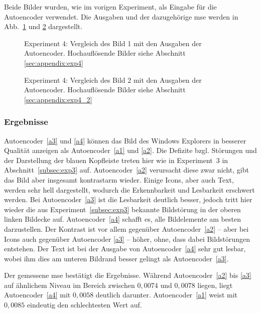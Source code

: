 Beide Bilder wurden, wie im vorigen Experiment, als Eingabe für die Autoencoder verwendet. Die Ausgaben und der dazugehörige \gls{mse} werden in Abb.~\ref{exp4_image:1} und \ref{exp4_image:2} dargestellt.

\begin{figure}[htbp]
    \centering
    \resizebox*{!}{.98\textheight}{}
    \caption{Experiment 4: Vergleich des Bild 1 mit den Ausgaben der Autoencoder. Hochauflösende Bilder siehe Abschnitt \ref{sec:appendix:exp4}}
    \label{exp4_image:1}
\end{figure}

\begin{figure}[htbp]
    \centering
    \resizebox*{!}{.98\textheight}{}
    \caption{Experiment 4: Vergleich des Bild 2 mit den Ausgaben der Autoencoder. Hochauflösende Bilder siehe Abschnitt \ref{sec:appendix:exp4_2}}
    \label{exp4_image:2}
\end{figure}

\subsubsection*{Ergebnisse}
Autoencoder~\ref{a3} und \ref{a4} können das Bild des Windows Explorers in besserer Qualität anzeigen als Autoencoder~\ref{a1} und \ref{a2}. Die Defizite bzgl. Störungen und der Darstellung der blauen Kopfleiste treten hier wie in Experiment~3 in Abschnitt~\ref{subsec:exp3} auf. Autoencoder~\ref{a2} verursacht diese zwar nicht, gibt das Bild aber insgesamt kontrastarm wieder. Einige Icons, aber auch Text, werden sehr hell dargestellt, wodurch die Erkennbarkeit und Lesbarkeit erschwert werden. Bei Autoencoder~\ref{a3} ist die Lesbarkeit deutlich besser, jedoch tritt hier wieder die aus Experiment~\ref{subsec:exp3} bekannte Bildstörung in der oberen linken Bildecke auf. Autoencoder~\ref{a4} schafft es, alle Bildelemente am besten darzustellen. Der Kontrast ist vor allem gegenüber Autoencoder~\ref{a2} -- aber bei Icons auch gegenüber Autoencoder \ref{a3} -- höher, ohne, dass dabei Bildstörungen entstehen. Der Text ist bei der Ausgabe von Autoencoder~\ref{a4} sehr gut lesbar, wobei ihm dies am unteren Bildrand besser gelingt als Autoencoder~\ref{a3}.

Der gemessene \gls{mse} bestätigt die Ergebnisse. Während Autoencoder~\ref{a2} bis \ref{a3} auf ähnlichem Niveau im Bereich zwischen $0,0074$ und $0,0078$ liegen, liegt Autoencoder~\ref{a4} mit $0,0058$ deutlich darunter. Autoencoder~\ref{a1} weist mit $0,0085$ eindeutig den schlechtesten Wert auf.

